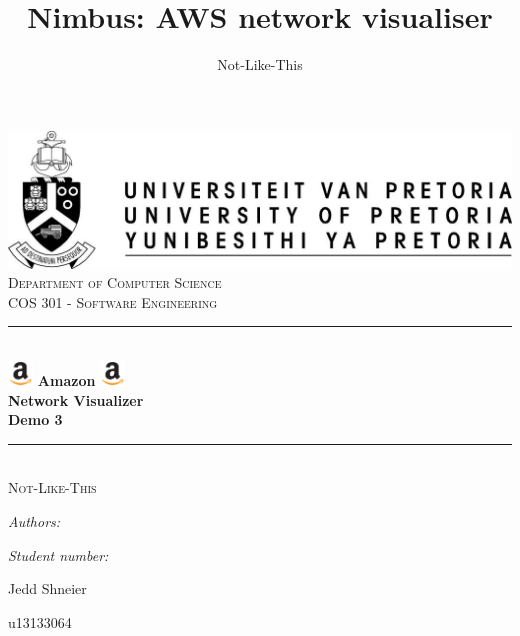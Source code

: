 \documentclass[hidelinks,a4paper,12pt]{article}
\author{Not-Like-This}
\title{ Nimbus: AWS network visualiser}
\newcommand{\HRule}{\rule{\linewidth}{0.5mm}}
\begin{document}
\setlength{\parskip}{6pt}

\begin{titlepage}

\begin{center}
\includegraphics[width=1\textwidth]{./images/up-logo.jpg}\\[0.4cm] 
\textsc{\LARGE Department of Computer Science}\\[1.5cm]
\textsc{\Large COS 301 - Software Engineering}\\[0.5cm]
\HRule \\[0.4cm]
\includegraphics[width=0.05\textwidth]{./images/logo.jpg} 
{ \huge \bfseries Amazon}
\includegraphics[width=0.05\textwidth]{./images/logo.jpg}\\[0.4cm] 
{ \huge \bfseries Network Visualizer}\\[0.4cm]
{ \huge \bfseries Demo 3}\\[0.4cm]
\HRule \\[0.4cm]
\textsc{\Large Not-Like-This}\\[0.5cm]
\begin{minipage}{0.4\textwidth}
\begin{flushleft} \large
\emph{Authors:}
\end{flushleft}
\end{minipage}
\begin{minipage}{0.4\textwidth}
\begin{flushright} \large
\emph{Student number:}
\end{flushright}
\end{minipage}

\begin{minipage}{0.4\textwidth}
\begin{flushleft} \large
Jedd {Shneier}
\end{flushleft}
\end{minipage}
\begin{minipage}{0.4\textwidth}
\begin{flushright} \large
\emph{}
u13133064
\end{flushright}
\end{minipage}


\end{center}
\end{titlepage}
\end{document}
